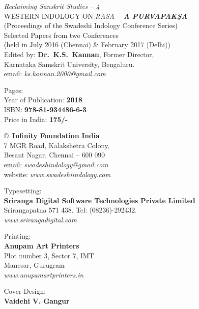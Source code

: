 \thispagestyle{empty}

\noindent
{\fontsize{9}{11}\selectfont\sl Reclaiming Sanskrit Studies -- 4}\\
WESTERN INDOLOGY ON {\sl RASA} {\sl\bfseries -- A PŪRVAPAKṢA}\\
(Proceedings of the Swadeshi Indology Conference Series)\\
Selected Papers from two Conferences\\ 
(held in July 2016 (Chennai) \& February 2017 (Delhi))\\
Edited by: {\bf Dr.\ K.S.\ Kannan}, Former Director,\\ 
Karnataka Samskrit University, Bengaluru.\\
email: {\sl ks.kannan.2000@gmail.com}
\vfill

\noindent
Pages: {\bf\pageref{bookend}}\\
Year of Publication: {\bf 2018}\\
ISBN: {\bf 978-81-934486-6-3}\\
Price in India: {\bf 175/-}
\vfill

\noindent
\copyright\ {\bf Infinity Foundation India}\\ 
7 MGR Road, Kalakshetra Colony,\\ 
Besant Nagar, Chennai -- 600 090\\
email: {\sl swadeshindology@gmail.com}\\
website: {\sl www.swadeshiindology.com} 
\vfill

\noindent
Typesetting:\\ 
{\bf Sriranga Digital Software Technologies Private Limited}\\ 
Srirangapatna 571 438. Tel: (08236)-292432.\\
{\sl www.srirangadigital.com}
\vfill

\noindent
Printing:\\
{\bf Anupam Art Printers}\\
Plot number 3, Sector 7, IMT\\
Manesar, Gurugram\\
{\sl www.anupamartprinters.in}
\noindent

\bigskip

Cover Design:\\ 
{\bf Vaidehi V. Gangur}
